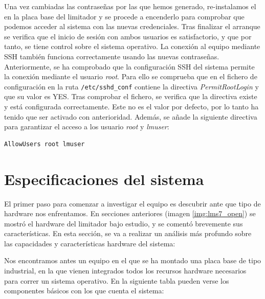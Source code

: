 Una vez cambiadas las contraseñas por las que hemos generado, re-instalamos el  en la placa base del limitador y se procede a encenderlo para comprobar que podemos acceder al sistema con las nuevas credenciales. Tras finalizar el arranque se verifica que el inicio de sesión con ambos usuarios es satisfactorio, y que por tanto, se tiene control sobre el sistema operativo. La conexión al equipo mediante \acrshort{SSH} también funciona correctamente usando las nuevas contraseñas. Anteriormente, se ha comprobado que la configuración \acrshort{SSH} del sistema permite la conexión mediante el usuario \textit{root}. Para ello se comprueba que en el fichero de configuración en la ruta \texttt{/etc/sshd\_conf} contiene la directiva \textit{PermitRootLogin} y que su valor es YES. Tras comprobar el fichero, se verifica que la directiva existe y está configurada correctamente. Este no es el valor por defecto, por lo tanto ha tenido que ser activado con anterioridad. Además, se añade la siguiente directiva para garantizar el acceso a los usuario \textit{root} y \textit{lmuser}: \newline

\begin{lstlisting}[nolol, language=XML, label={lst:confSSH}, caption={Directiva del fichero}]
    AllowUsers root lmuser
\end{lstlisting}

\section{Especificaciones del sistema}

El primer paso para comenzar a investigar el equipo es descubrir ante que tipo de hardware nos enfrentamos. En secciones anteriores (imagen \ref{img:lms7_open}) se mostró el hardware del limitador bajo estudio, y se comentó brevemente sus características. En esta sección, se va a realizar un análisis más profundo sobre las capacidades y características hardware del sistema:

Nos encontramos antes un equipo en el que se ha montado una placa base de tipo industrial, en la que vienen integrados todos los recursos hardware necesarios para correr un sistema operativo. En la siguiente tabla pueden verse los componentes básicos con los que cuenta el sistema:

